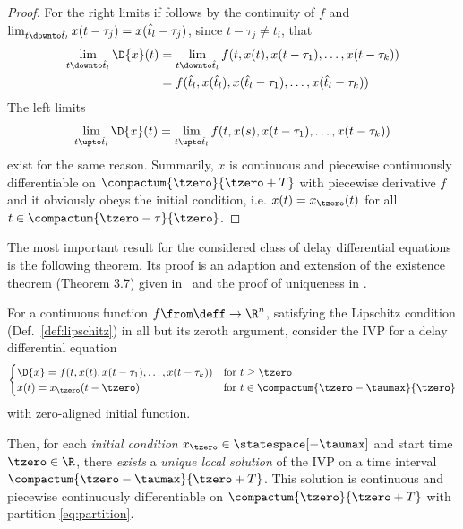 \begin{proof}
        For the right limits if follows by the continuity of $f$ and $\lim_{t\downto\hat{t}_l} x(t-\tau_j) = x(\hat{t}_l-\tau_j)$, since $t-\tau_j \neq t_i$, that
        \begin{align*}
            \lim_{t\downto\hat{t}_l} \D{x}(t)
            &= \lim_{t\downto\hat{t}_l} f(t,x(t),x(t-\tau_1),\ldots,x(t-\tau_k))\\
            &= f(\hat{t}_l,x(\hat{t}_l),x(\hat{t}_l-\tau_1),\ldots,x(\hat{t}_l-\tau_k))
        \end{align*}
        The left limits
        \begin{equation*}
            \lim_{t\upto\hat{t}_l} \D{x}(t) = \lim_{t\upto\hat{t}_l} f(t,x(s),x(t-\tau_1),\ldots,x(t-\tau_k)) 
        \end{equation*}
        exist for the same reason.
        Summarily, $x$ is continuous and piecewise continuously differentiable on $\compactum{\tzero}{\tzero+T}$ with piecewise derivative $f$ and it obviously obeys the initial condition, i.e. $x(t)=x_{\tzero}(t)$ for all $t\in\compactum{\tzero-\tau}{\tzero}$.
    \end{proof}

    The most important result for the considered class of delay differential equations is the following theorem.
    Its proof is an adaption and extension of the existence theorem (Theorem 3.7) given in~\cite{Smith10IntroDDE} and the proof of uniqueness in \cite{PruessWilke10GewDiffGl}.

    \begin{theorem}
    \label{thm:solution-existence}
        For a continuous function $f\from\deff\to\R^n$, satisfying the Lipschitz condition (Def.~\ref{def:lipschitz}) in all but its zeroth argument, consider the IVP for a delay differential equation
        \begin{equation}
            \begin{cases}
                \D{x} = f(t,x(t),x(t-\tau_1),\ldots,x(t-\tau_k)) & \text{for } t\geq\tzero\\
                x(t) = x_\tzero(t-\tzero) & \text{for } t\in\compactum{\tzero-\taumax}{\tzero}
            \end{cases}
        \end{equation}
        with zero-aligned initial function.
        

        Then, for each \emph{initial condition} $x_{\tzero}\in\statespace[-\taumax]$ and start time $\tzero\in\R$, there \emph{exists} a \emph{unique local solution} of the IVP on a time interval $\compactum{\tzero-\taumax}{\tzero+T}$.
        This solution is continuous and piecewise continuously differentiable on $\compactum{\tzero}{\tzero+T}$ with partition \eqref{eq:partition}.
    \end{theorem}

